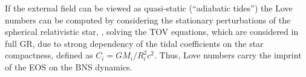 %
%
If the external field can be viewed as quasi-static (``adiabatic tides'') the 
Love numbers can be computed by considering the stationary perturbations of the spherical 
relativistic star, \ie, solving the \ac{TOV} equations, which are considered in full \ac{GR}, 
due to strong dependency of the tidal coefficients on the star compactness, defined as 
$C_{i} = GM_i/R_i^2c^2$. 
%
Thus, Love numbers carry the imprint of the \ac{EOS} on the \ac{BNS} dynamics.
%
%


